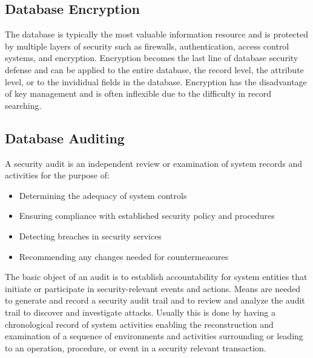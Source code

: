 \documentclass{math}
\begin{document}
\subsection*{Database Encryption}
The database is typically the most valuable information resource and is
protected by multiple layers of security such as firewalls, authentication,
access control systems, and encryption. Encryption becomes the last line of
database security defense and can be applied to the entire database, the
record level, the attribute level, or to the invididual fields in the database.
Encryption has the disadvantage of key management and is often inflexible due
to the difficulty in record searching.

\subsection*{Database Auditing}
A security audit is an independent review or examination of system records and
activities for the purpose of:
\begin{itemize}
  \item Determining the adequacy of system controls
  \item Ensuring compliance with established security policy and procedures
  \item Detecting breaches in security services
  \item Recommending any changes needed for countermeasures
\end{itemize}
The basic object of an audit is to establish accountability for system entities
that initiate or participate in security-relevant events and actions. Means are
needed to generate and record a security audit trail and to review and analyze
the audit trail to discover and investigate attacks. Usually this is done by
having a chronological record of system activities enabling the reconstruction
and examination of a sequence of environments and activities surrounding
or leading to an operation, procedure, or event in a security relevant
transaction.
\end{document}
